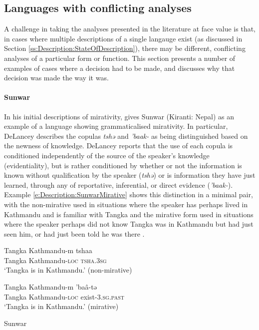 \subsection{Languages with conflicting analyses}\label{ss:Description:Conflicts}
A challenge in taking the analyses presented in the literature at face value is that, in cases where multiple descriptions of a single langauge exist (as discussed in Section \ref{ss:Description:StateOfDescription}), there may be different, conflicting analyses of a particular form or function. This section presents a number of examples of cases where a decision had to be made, and discusses why that decision was made the way it was. 

\paragraph{Sunwar}
In his initial descriptions of mirativity,  gives Sunwar (Kiranti: Nepal) as an example of a language showing grammaticalised mirativity. In particular, DeLancey describes the copulas \textit{tshə} and \textit{'baak-} as being distinguished based on the newness of knowledge. DeLancey reports that the use of each copula is conditioned independently of the source of the speaker's knowledge (evidentiality), but is rather conditioned by whether or not the information is known without qualification by the speaker (\textit{tshə}) or is information they have just learned, through any of reportative, inferential, or direct evidence (\textit{'baak-}). Example \ref{e:Description:SunwarMirative} shows this distinction in a minimal pair, with the non-mirative used in situations where the speaker has perhaps lived in Kathmandu and is familiar with Tangka and the mirative form used in situations where the speaker perhaps did not know Tangka was in Kathmandu but had just seen him, or had just been told he was there \cite[42]{DeLanceyMirativity1997}.

\begin{exe}
        \ex\label{e:Description:SunwarMirative}
        \begin{xlist}
                \ex 
                \gll Tangka Kathmandu-m tshaa \\
                Tangka Kathmandu-\textsc{loc} \textsc{tsha.3sg} \\
                \glt `Tangka is in Kathmandu.' (non-mirative)

                \ex
                \gll Tangka Kathmandu-m 'baâ-tə \\
                Tangka Kathmandu-\textsc{loc} exist-\textsc{3.sg.past} \\
                \glt `Tangka is in Kathmandu.' (mirative)
        \end{xlist}
        Sunwar \cite[Kiranti: Nepal,][41-42]{DeLanceyMirativity1997}
\end{exe}

